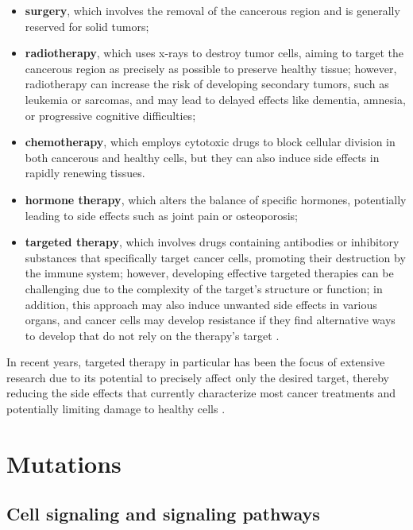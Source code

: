 \begin{itemize}
    \item \textbf{surgery}, which involves the removal of the cancerous region and is generally reserved for solid tumors;
    \item \textbf{radiotherapy}, which uses x-rays to destroy tumor cells, aiming to target the cancerous region as precisely as possible to preserve healthy tissue; however, radiotherapy can increase the risk of developing secondary tumors, such as leukemia or sarcomas, and may lead to delayed effects like dementia, amnesia, or progressive cognitive difficulties;
    \item \textbf{chemotherapy}, which employs cytotoxic drugs to block cellular division in both cancerous and healthy cells, but they can also induce side effects in rapidly renewing tissues.
    \item \textbf{hormone therapy}, which alters the balance of specific hormones, potentially leading to side effects such as joint pain or osteoporosis;
    \item \textbf{targeted therapy}, which involves drugs containing antibodies or inhibitory substances that specifically target cancer cells, promoting their destruction by the immune system; however, developing effective targeted therapies can be challenging due to the complexity of the target's structure or function; in addition, this approach may also induce unwanted side effects in various organs, and cancer cells may develop resistance if they find alternative ways to develop that do not rely on the therapy's target \cite{target_therapy1} . \end{itemize}

In recent years, targeted therapy in particular has been the focus of extensive research due to its potential to precisely affect only the desired target, thereby reducing the side effects that currently characterize most cancer treatments and potentially limiting damage to healthy cells \cite{target_therapy3}. 

\section{Mutations}

\subsection{Cell signaling and signaling pathways}

